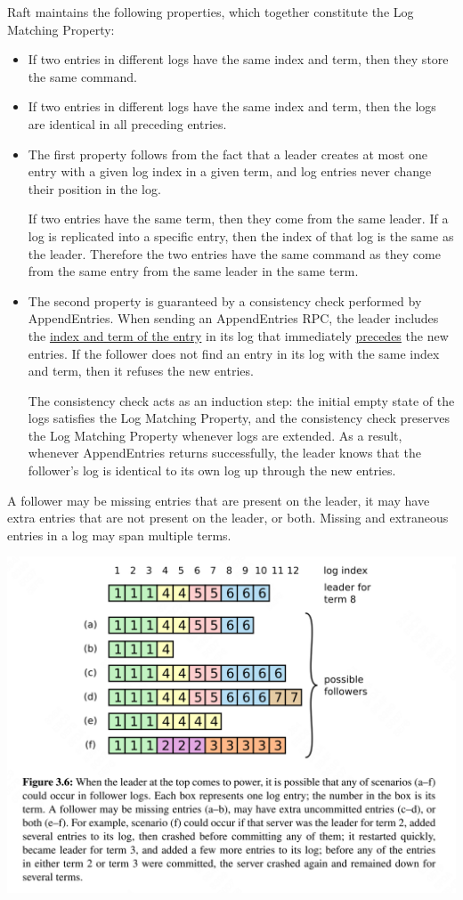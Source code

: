 \documentclass[11pt]{article}
\begin{document}
Raft maintains the following properties, which together constitute the Log Matching Property:
\begin{itemize}
\item If two entries in different logs have the same index and term, then they store the same command.
\item If two entries in different logs have the same index and term, then the logs are identical in all
preceding entries.

\item The first property follows from the fact that a leader creates at most one entry with a given log
index in a given term, and log entries never change their position in the log.

If two entries have the same term, then they come from the same leader. If a log is replicated into
a specific entry, then the index of that log is the same as the leader. Therefore the two entries
have the same command as they come from the same entry from the same leader in the same term.
\item The second property is guaranteed by a consistency check performed by AppendEntries. When sending an
AppendEntries RPC, the leader includes the \uline{index and term of the entry} in its log that immediately
\uline{precedes} the new entries. If the follower does not find an entry in its log with the same index and
term, then it refuses the new entries.

The consistency check acts as an induction step: the initial empty state of the logs satisfies the
Log Matching Property, and the consistency check preserves the Log Matching Property whenever logs
are extended. As a result, whenever AppendEntries returns successfully, the leader knows that the
follower’s log is identical to its own log up through the new entries.
\end{itemize}


A follower may be missing entries that are present on the leader, it may have extra entries that are
not present on the leader, or both. Missing and extraneous entries in a log may span multiple terms.
\begin{center}
\includegraphics[width=.9\textwidth]{../../images/papers/13.png}
\label{3.6}
\end{center}
\end{document}
